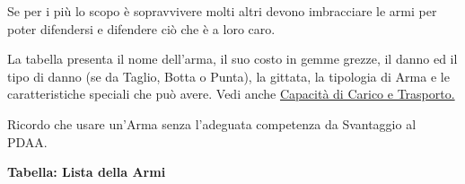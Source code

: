 \documentclass[12pt,a4paper,twoside,openany]{book}
\begin{document}
\medskip

Se per i più lo scopo è sopravvivere molti altri devono imbracciare le armi per poter difendersi e difendere ciò che è a loro caro.

La tabella presenta il nome dell'arma, il suo costo in gemme grezze, il danno ed il tipo di danno (se da Taglio, Botta o Punta), la gittata, la tipologia di Arma e le caratteristiche speciali che può avere. Vedi anche \hyperref[sec:capacita-di-carico-e-trasporto-ingombro]{Capacità di Carico e Trasporto.}

Ricordo che usare un'Arma senza l'adeguata competenza da Svantaggio al PDAA.

\medskip

\textbf{Tabella: Lista della Armi}

\end{document}
